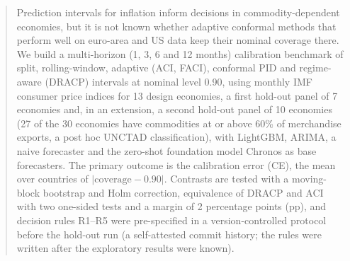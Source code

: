 \begin{abstract}
\noindent
Prediction intervals for inflation inform decisions in commodity-dependent economies, but it is not known whether adaptive conformal methods that perform well on euro-area and US data keep their nominal coverage there. We build a multi-horizon (1, 3, 6 and 12 months) calibration benchmark of split, rolling-window, adaptive (ACI, FACI), conformal PID and regime-aware (DRACP) intervals at nominal level 0.90, using monthly IMF consumer price indices for 13 design economies, a first hold-out panel of 7 economies and, in an extension, a second hold-out panel of 10 economies (27 of the 30 economies have commodities at or above 60\% of merchandise exports, a post hoc UNCTAD classification), with LightGBM, ARIMA, a naive forecaster and the zero-shot foundation model Chronos as base forecasters. The primary outcome is the calibration error (CE), the mean over countries of $|\text{coverage}-0.90|$. Contrasts are tested with a moving-block bootstrap and Holm correction, equivalence of DRACP and ACI with two one-sided tests and a margin of 2 percentage points (pp), and decision rules R1--R5 were pre-specified in a version-controlled protocol before the hold-out run (a self-attested commit history; the rules were written after the exploratory results were known).


\end{abstract}
